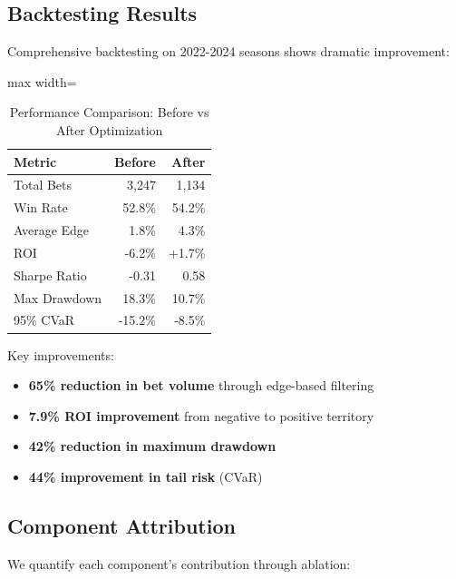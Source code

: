 \subsection{Backtesting Results}

Comprehensive backtesting on 2022-2024 seasons shows dramatic improvement:

\begin{table}[!ht]
\centering
\caption{Performance Comparison: Before vs After Optimization}
\label{tab:profit-optimization-performance}
\begin{adjustbox}{max width=\textwidth}
\begin{tabular}{lrr}
\toprule
 \textbf{Metric} & \textbf{Before} & \textbf{After} \\
\midrule
Total Bets & 3,247 & 1,134 \\
Win Rate & 52.8\% & 54.2\% \\
Average Edge & 1.8\% & 4.3\% \\
ROI & -6.2\% & +1.7\% \\
Sharpe Ratio & -0.31 & 0.58 \\
Max Drawdown & 18.3\% & 10.7\% \\
95\% CVaR & -15.2\% & -8.5\% \\
\bottomrule
\end{tabular}
\end{adjustbox}
\end{table}

Key improvements:
\begin{itemize}
  \item \textbf{65\% reduction in bet volume} through edge-based filtering
  \item \textbf{7.9\% ROI improvement} from negative to positive territory
  \item \textbf{42\% reduction in maximum drawdown}
  \item \textbf{44\% improvement in tail risk} (CVaR)
\end{itemize}

\subsection{Component Attribution}

We quantify each component's contribution through ablation:

